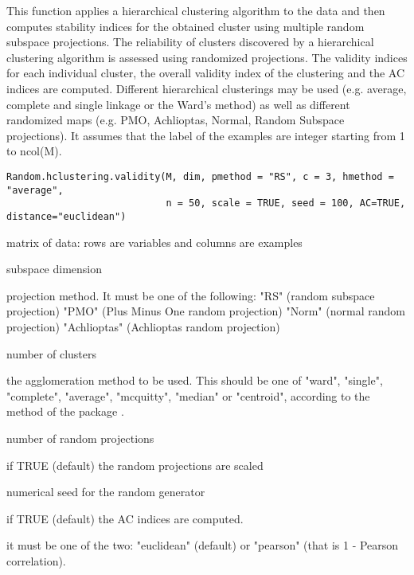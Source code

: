 \documentclass{article}
\begin{document}
\begin{Description}\relax
This function applies a hierarchical clustering algorithm to the data and then computes stability indices for the
obtained cluster using multiple random subspace projections. 
The reliability of clusters discovered by a hierarchical clustering algorithm is assessed using randomized projections.
The validity indices for each individual cluster, the
overall validity index of the clustering and the AC indices are computed.
Different hierarchical clusterings may be used (e.g. average, complete and single linkage or the Ward's method) as
well as different randomized maps (e.g. PMO, Achlioptas, Normal, Random Subspace projections).
It assumes that the label of the examples are integer starting from 1 to ncol(M).
\end{Description}
\begin{Usage}
\begin{verbatim}
Random.hclustering.validity(M, dim, pmethod = "RS", c = 3, hmethod = "average", 
                            n = 50, scale = TRUE, seed = 100, AC=TRUE, distance="euclidean")
\end{verbatim}
\end{Usage}
\begin{Arguments}
\begin{ldescription}
\item[\code{M}] matrix of data: rows are variables and columns are examples 
\item[\code{dim}] subspace dimension 
\item[\code{pmethod}] projection method. It must be one of the following: 
"RS" (random subspace projection)
"PMO" (Plus Minus One random projection)
"Norm" (normal random projection)
"Achlioptas" (Achlioptas random projection) 
\item[\code{c}] number of clusters 
\item[\code{hmethod}] the agglomeration method to be used. This should be one of 
"ward", "single", "complete", "average", "mcquitty", "median" or "centroid", 
according to the 
method of the package . 
\item[\code{n}] number of  random projections 
\item[\code{scale}] if TRUE (default) the random projections are scaled 
\item[\code{seed}] numerical seed for the random generator 
\item[\code{AC}] if TRUE (default) the AC indices are computed. 
\item[\code{distance}] it must be one of the two: "euclidean" (default) or "pearson" (that is 1 - Pearson correlation). 
\end{ldescription}
\end{Arguments}
\end{document}
